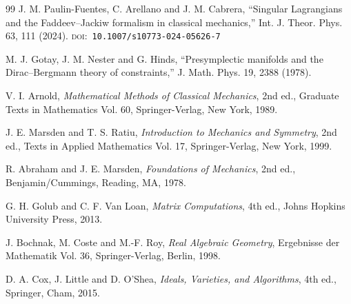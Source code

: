 \documentclass[12pt]{article}
\theoremstyle{plain}
\theoremstyle{definition}
\theoremstyle{remark}
\newcommand{\doi}[1]{\textsc{doi:}~\texttt{#1}}
\begin{document}
\begin{thebibliography}{99}
		 J. M. Paulin-Fuentes, C. Arellano and
		J. M. Cabrera, ``Singular Lagrangians and the Faddeev--Jackiw formalism in
		classical mechanics,'' Int. J. Theor. Phys. \textrm{63}, 111 (2024).
		\doi{10.1007/s10773-024-05626-7}
		
		 M. J. Gotay, J. M. Nester and G. Hinds, ``Presymplectic
		manifolds and the Dirac--Bergmann theory of constraints,'' J. Math. Phys.
		\textrm{19}, 2388 (1978).
		
		 V. I. Arnold, \emph{Mathematical Methods of Classical
			Mechanics}, 2nd ed., Graduate Texts in Mathematics Vol. 60, Springer-Verlag,
		New York, 1989.
		
		 J. E. Marsden and T. S. Ratiu, \emph{Introduction to Mechanics
			and Symmetry}, 2nd ed., Texts in Applied Mathematics Vol. 17, Springer-Verlag,
		New York, 1999.
		
		 R. Abraham and J. E. Marsden, \emph{Foundations of Mechanics},
		2nd ed., Benjamin/Cummings, Reading, MA, 1978.
		
		 G. H. Golub and C. F. Van Loan, \emph{Matrix Computations},
		4th ed., Johns Hopkins University Press, 2013.
		
		 J. Bochnak, M. Coste and M.-F. Roy, \emph{Real Algebraic
			Geometry}, Ergebnisse der Mathematik Vol. 36, Springer-Verlag, Berlin, 1998.
		
		 D. A. Cox, J. Little and D. O'Shea, \emph{Ideals, Varieties,
			and Algorithms}, 4th ed., Springer, Cham, 2015.
		
	\end{thebibliography}
	
\end{document}
